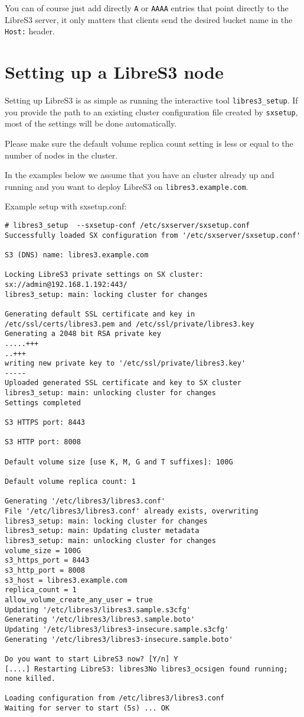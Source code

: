 You can of course just add directly \verb|A| or \verb|AAAA| entries that point
directly to the LibreS3 server, it only matters that
clients send the desired bucket name in the \verb|Host:| header.

\section{Setting up a LibreS3 node}

Setting up LibreS3 is as simple as running the interactive tool \verb+libres3_setup+.
If you provide the path to an existing \SX cluster configuration file created
by \verb+sxsetup+, most of the settings will be done automatically.

Please make sure the default volume replica count setting is less or equal
to the number of nodes in the \SX cluster.

In the examples below we assume that you
have an \SX cluster already up and running and you want to deploy
LibreS3 on \verb|libres3.example.com|.

Example setup with sxsetup.conf:

\begin{lstlisting}
# libres3_setup  --sxsetup-conf /etc/sxserver/sxsetup.conf
Successfully loaded SX configuration from '/etc/sxserver/sxsetup.conf'

S3 (DNS) name: libres3.example.com

Locking LibreS3 private settings on SX cluster: sx://admin@192.168.1.192:443/
libres3_setup: main: locking cluster for changes

Generating default SSL certificate and key in /etc/ssl/certs/libres3.pem and /etc/ssl/private/libres3.key
Generating a 2048 bit RSA private key
.....+++
..+++
writing new private key to '/etc/ssl/private/libres3.key'
-----
Uploaded generated SSL certificate and key to SX cluster
libres3_setup: main: unlocking cluster for changes
Settings completed

S3 HTTPS port: 8443

S3 HTTP port: 8008

Default volume size [use K, M, G and T suffixes]: 100G

Default volume replica count: 1

Generating '/etc/libres3/libres3.conf'
File '/etc/libres3/libres3.conf' already exists, overwriting
libres3_setup: main: locking cluster for changes
libres3_setup: main: Updating cluster metadata
libres3_setup: main: unlocking cluster for changes
volume_size = 100G
s3_https_port = 8443
s3_http_port = 8008
s3_host = libres3.example.com
replica_count = 1
allow_volume_create_any_user = true
Updating '/etc/libres3/libres3.sample.s3cfg'
Generating '/etc/libres3/libres3.sample.boto'
Updating '/etc/libres3/libres3-insecure.sample.s3cfg'
Generating '/etc/libres3/libres3-insecure.sample.boto'

Do you want to start LibreS3 now? [Y/n] Y
[....] Restarting LibreS3: libres3No libres3_ocsigen found running; none killed.

Loading configuration from /etc/libres3/libres3.conf
Waiting for server to start (5s) ... OK
\end{lstlisting}


